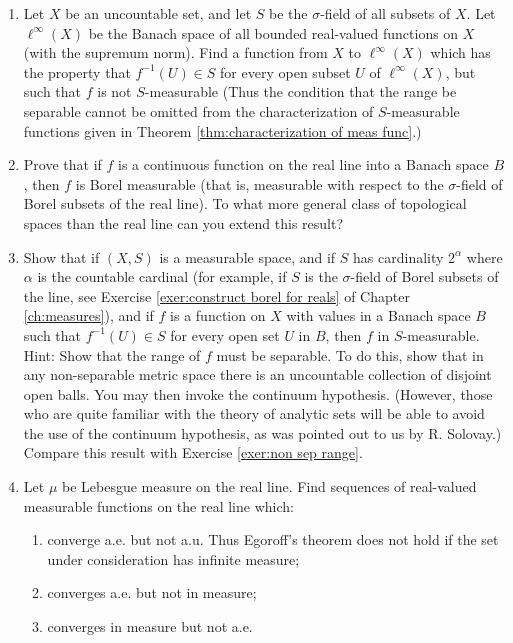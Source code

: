 \begin{enumerate}[label=\arabic*),ref=\arabic*]
\item\label{exer:non sep range}
Let $X$ be an uncountable set, and let $S$ be the $\sigma$-field of all subsets of $X$. Let $\ell^\infty(X)$ be the Banach space of all bounded real-valued functions on $X$ (with the supremum norm). Find a function from $X$ to $\ell^\infty(X)$ which has the property that $f^{-1}(U)\in S$ for every open subset $U$ of $\ell^\infty(X)$, but such that $f$ is not $S$-measurable (Thus the condition that the range be separable cannot be omitted from the characterization of $S$-measurable functions given in Theorem \ref{thm:characterization of meas func}.)

\item\label{exer:cts on R meas}
Prove that if $f$ is a continuous function on the real line into a Banach space $B$, then $f$ is Borel measurable (that is, measurable with respect to the $\sigma$-field of Borel subsets of the real line). To what more general class of topological spaces than the real line can you extend this result?

\item Show that if $(X,S)$ is a measurable space, and if $S$ has cardinality $2^\alpha$ where $\alpha$ is the countable cardinal (for example, if $S$ is the $\sigma$-field of Borel subsets of the line, see Exercise \ref{exer:construct borel for reals} of Chapter \ref{ch:measures}), and if $f$ is a function on $X$ with values in a Banach space $B$ such that $f^{-1}(U)\in S$ for every open set $U$ in $B$, then $f$ in $S$-measurable. Hint: Show that the range of $f$ must be separable. To do this, show that in any non-separable metric space there is an uncountable collection of disjoint open balls. You may then invoke the continuum hypothesis. (However, those who are quite familiar with the theory of analytic sets will be able to avoid the use of the continuum hypothesis, as was pointed out to us by R. Solovay.) Compare this result with Exercise \ref{exer:non sep range}.

\item Let $\mu$ be Lebesgue measure on the real line. Find sequences of real-valued measurable functions on the real line which:
\begin{enumerate}[label=\alph*),ref=\theenumi\alph*)]
    \item converge a.e. but not a.u. Thus Egoroff's theorem does not hold if the set under consideration has infinite measure;
    \item converges a.e. but not in measure;
    \item\label{exer:item:in measure not ae}
    converges in measure but not a.e.
\end{enumerate}


\end{enumerate}
